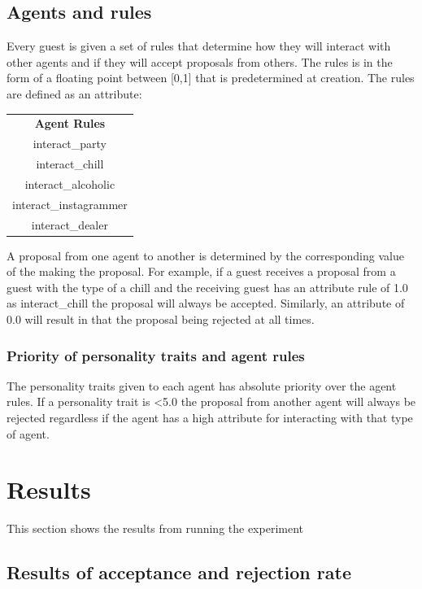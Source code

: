 \documentclass[a4paper,10pt]{article}
\begin{document}
\subsection{Agents and rules}
Every guest is given a set of rules that determine how they will interact with other agents and if they will accept proposals from others. The rules is in the form of a floating point between [0,1] that is predetermined at creation. The rules are defined as an attribute:

\begin{center}
\begin{tabular}{ |c| } 
 \hline
 \textbf{Agent Rules} \\
 interact\_party \\
 interact\_chill \\
 interact\_alcoholic \\
 interact\_instagrammer \\
 interact\_dealer \\
 \hline
\end{tabular}
\end{center}

A proposal from one agent to another is determined by the corresponding value of the making the proposal. For example, if a guest receives a proposal from a guest with the type of a chill and the receiving guest has an attribute rule of 1.0 as interact\_chill the proposal will always be accepted. Similarly, an attribute of 0.0 will result in that the proposal being rejected at all times.

\subsubsection{Priority of personality traits and agent rules}
The personality traits given to each agent has absolute priority over the agent rules. If a personality trait is \textless 5.0 the proposal from another agent will always be rejected regardless if the agent has a high attribute for interacting with that type of agent. 

\section{Results}

This section shows the results from running the experiment

\subsection{Results of acceptance and rejection rate}
\end{document}
